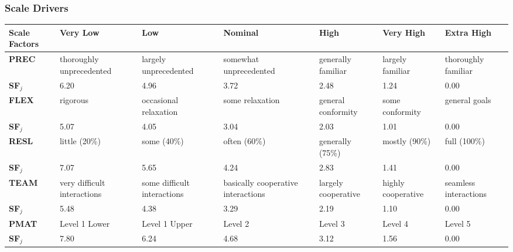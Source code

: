 \subsubsection{Scale Drivers}

\hspace*{-2.5cm}\begin{tabular}{|p{2cm}|p{2cm}|p{2cm}|p{2cm}|p{2cm}|p{2cm}|p{2cm}|}
	\hline
	\textbf{Scale Factors} & \textbf{Very Low} & \textbf{Low} & \textbf{Nominal} & \textbf{High} & \textbf{Very High} & \textbf{Extra High}\\
	\hline
	\textbf{PREC} & thoroughly unprecedented & largely unprecedented & somewhat unprecedented & generally familiar & largely familiar & thoroughly familiar\\
	\textbf{SF$_j$} & 6.20 & 4.96 & 3.72 & 2.48 & 1.24 & 0.00\\\hline
	\textbf{FLEX} & rigorous & occasional relaxation & some relaxation & general conformity & some conformity & general goals\\
	\textbf{SF$_j$} & 5.07 & 4.05 & 3.04 & 2.03 & 1.01 & 0.00\\\hline
	\textbf{RESL} & little (20\%) & some (40\%) & often (60\%) & generally (75\%) & mostly (90\%) & full (100\%)\\
	\textbf{SF$_j$} & 7.07 & 5.65 & 4.24 & 2.83 & 1.41 & 0.00\\\hline
	\textbf{TEAM} & very difficult interactions & some difficult interactions & basically cooperative interactions & largely cooperative & highly cooperative & seamless interactions\\
	\textbf{SF$_j$} & 5.48 & 4.38 & 3.29 & 2.19 & 1.10 & 0.00\\\hline
	\textbf{PMAT} & Level 1 Lower & Level 1 Upper & Level 2 & Level 3 & Level 4 & Level 5\\
	\textbf{SF$_j$} & 7.80 & 6.24 & 4.68 & 3.12 & 1.56 & 0.00\\\hline
\end{tabular}
